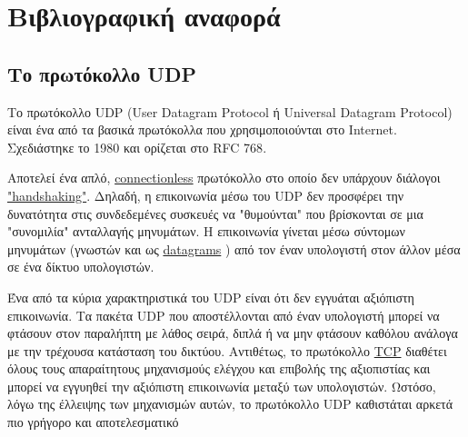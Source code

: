 \chapter{Βιβλιογραφική αναφορά}
\section{Το πρωτόκολλο UDP}
Το πρωτόκολλο UDP (User Datagram Protocol ή Universal Datagram Protocol)
είναι ένα από τα βασικά πρωτόκολλα που χρησιμοποιούνται στο Internet.
Σχεδιάστηκε το 1980 και ορίζεται στο RFC 768\cite{rfc768}\cite{wiki:udp}.

Αποτελεί ένα απλό,
\href{https://en.wikipedia.org/wiki/Connectionless_communication}{connectionless}
πρωτόκολλο στο οποίο δεν υπάρχουν διάλογοι
\href{https://en.wikipedia.org/wiki/Handshaking}{"handshaking"}.
Δηλαδή, η επικοινωνία μέσω του UDP δεν προσφέρει την δυνατότητα στις συνδεδεμένες συσκευές να "θυμούνται" που βρίσκονται σε μια "συνομιλία" ανταλλαγής μηνυμάτων.
Η επικοινωνία γίνεται μέσω σύντομων μηνυμάτων (γνωστών και ως
\href{https://en.wikipedia.org/wiki/Datagram}{datagrams}
) από τον έναν υπολογιστή στον άλλον μέσα σε ένα δίκτυο υπολογιστών.

Ένα από τα κύρια χαρακτηριστικά του UDP είναι ότι δεν εγγυάται αξιόπιστη επικοινωνία.
Τα πακέτα UDP που αποστέλλονται από έναν υπολογιστή μπορεί να φτάσουν στον παραλήπτη με λάθος σειρά, διπλά ή να μην φτάσουν καθόλου ανάλογα με την τρέχουσα κατάσταση του δικτύου.
Αντιθέτως, το πρωτόκολλο
\href{https://en.wikipedia.org/wiki/Transmission_Control_Protocol}{TCP}
διαθέτει όλους τους απαραίτητους μηχανισμούς ελέγχου και επιβολής της αξιοπιστίας και μπορεί να εγγυηθεί την αξιόπιστη επικοινωνία μεταξύ των υπολογιστών.
Ωστόσο, λόγω της έλλειψης των μηχανισμών αυτών, το πρωτόκολλο UDP καθιστάται αρκετά πιο γρήγορο και αποτελεσματικό

